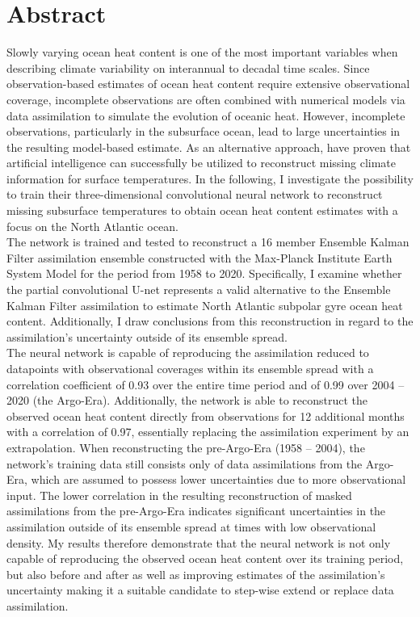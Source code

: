 \documentclass[Masterarbeit.tex]{subfile}
\begin{document}
	
	\chapter*{Abstract}
	
	Slowly varying ocean heat content is one of the most important variables when describing climate variability on interannual to decadal time scales. Since observation-based estimates of ocean heat content require extensive observational coverage, incomplete observations are often combined with numerical models via data assimilation to simulate the evolution of oceanic heat. However, incomplete observations, particularly in the subsurface ocean, lead to large uncertainties in the resulting model-based estimate. As an alternative approach, \cite{kadow_artificial_2020} have proven that artificial intelligence can successfully be utilized to reconstruct missing climate information for surface temperatures. In the following, I investigate the possibility to train their three-dimensional convolutional neural network to reconstruct missing subsurface temperatures to obtain ocean heat content estimates with a focus on the North Atlantic ocean. \\
	The network is trained and tested to reconstruct a 16 member Ensemble Kalman Filter assimilation ensemble constructed with the Max-Planck Institute Earth System Model for the period from 1958 to 2020. Specifically, I examine whether the partial convolutional U-net represents a valid alternative to the Ensemble Kalman Filter assimilation to estimate North Atlantic subpolar gyre ocean heat content. Additionally, I draw conclusions from this reconstruction in regard to the assimilation's uncertainty outside of its ensemble spread. \\
	The neural network is capable of reproducing the assimilation reduced to datapoints with observational coverages within its ensemble spread with a correlation coefficient of 0.93 over the entire time period and of 0.99 over 2004 -- 2020 (the Argo-Era). Additionally, the network is able to reconstruct the observed ocean heat content directly from observations for 12 additional months with a correlation of 0.97, essentially replacing the assimilation experiment by an extrapolation. When reconstructing the pre-Argo-Era (1958 -- 2004), the network's training data still consists only of data assimilations from the Argo-Era, which are assumed to possess lower uncertainties due to more observational input. The lower correlation in the resulting reconstruction of masked assimilations from the pre-Argo-Era indicates significant uncertainties in the assimilation outside of its ensemble spread at times with low observational density. My results therefore demonstrate that the neural network is not only capable of reproducing the observed ocean heat content over its training period, but also before and after as well as improving estimates of the assimilation's uncertainty making it a suitable candidate to step-wise extend or replace data assimilation. \\
	
	
\end{document}
